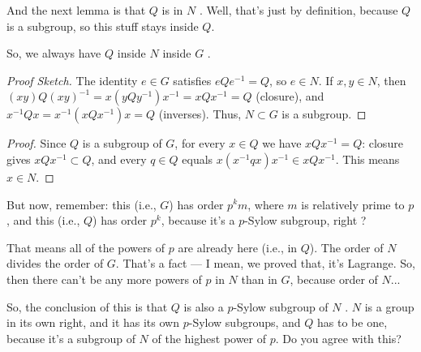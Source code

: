 \begin{proofWrapper}
\begin{speech}[00:11:22 - 00:12:10]
And the next lemma is that $Q$ is in $N$ . Well, that's just by definition, because $Q$ is a subgroup, so this stuff stays inside $Q$.

So, we always have $Q$ inside $N$ inside $G$ .
\end{speech}

\begin{content}
\begin{proof}[Proof Sketch]
The identity $e \in G$ satisfies $e Q e^{-1} = Q$, so $e \in N$. If $x, y \in N$, then $(xy) Q (xy)^{-1} = x (y Q y^{-1}) x^{-1} = x Q x^{-1} = Q$ (closure), and $x^{-1} Q x = x^{-1} (x Q x^{-1}) x = Q$ (inverses). Thus, $N \subset G$ is a subgroup.
\end{proof}

\begin{proof}
Since $Q$ is a subgroup of $G$, for every $x \in Q$ we have $x Q x^{-1} = Q$: closure gives $x Q x^{-1} \subset Q$, and every $q \in Q$ equals $x (x^{-1} q x) x^{-1} \in x Q x^{-1}$. This means $x \in N$.
\end{proof}
\end{content}

\begin{speech}[00:12:10 - 00:13:08]
But now, remember: this (i.e., $G$) has order $p^k m$, where $m$ is relatively prime to $p$, and this (i.e., $Q$) has order $p^k$, because it's a $p$-Sylow subgroup, right ?

That means all of the powers of $p$ are already here (i.e., in $Q$). The order of $N$ divides the order of $G$. That's a fact --- I mean, we proved that, it's Lagrange. So, then there can't be any more powers of $p$ in $N$ than in $G$, because order of $N$...

So, the conclusion of this is that $Q$ is also a $p$-Sylow subgroup of $N$ . $N$ is a group in its own right, and it has its own $p$-Sylow subgroups, and $Q$ has to be one, because it's a subgroup of $N$ of the highest power of $p$. Do you agree with this?
\end{speech}


\end{proofWrapper}
